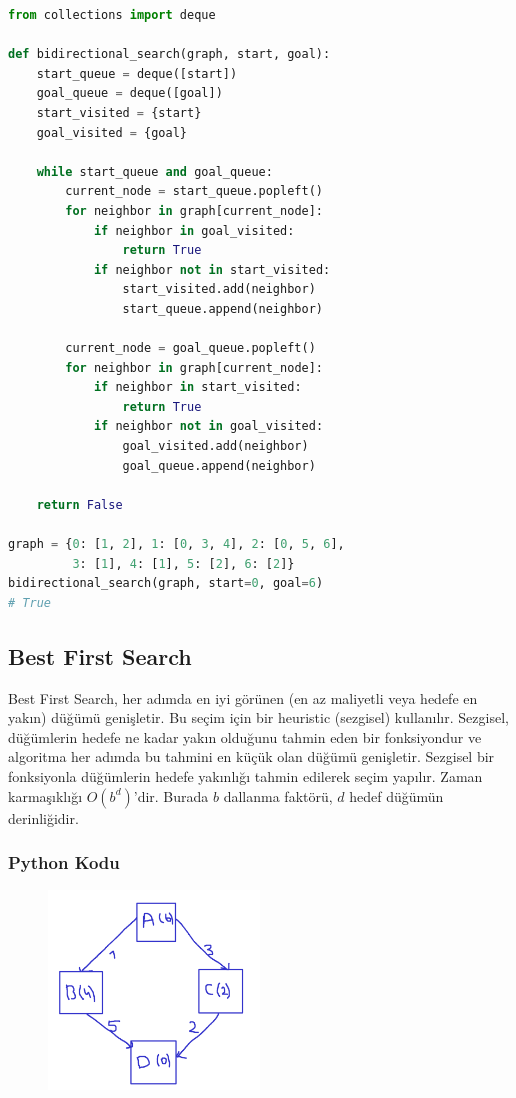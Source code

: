 \begin{lstlisting}[language=Python]
from collections import deque

def bidirectional_search(graph, start, goal):
    start_queue = deque([start])
    goal_queue = deque([goal])
    start_visited = {start}
    goal_visited = {goal}

    while start_queue and goal_queue:
        current_node = start_queue.popleft()
        for neighbor in graph[current_node]:
            if neighbor in goal_visited:
                return True
            if neighbor not in start_visited:
                start_visited.add(neighbor)
                start_queue.append(neighbor)

        current_node = goal_queue.popleft()
        for neighbor in graph[current_node]:
            if neighbor in start_visited:
                return True
            if neighbor not in goal_visited:
                goal_visited.add(neighbor)
                goal_queue.append(neighbor)

    return False

graph = {0: [1, 2], 1: [0, 3, 4], 2: [0, 5, 6],
         3: [1], 4: [1], 5: [2], 6: [2]}
bidirectional_search(graph, start=0, goal=6)
# True
\end{lstlisting}

\newpage

\subsection{Best First Search}

Best First Search, her adımda en iyi görünen (en az maliyetli veya hedefe en yakın) düğümü genişletir. Bu seçim için bir heuristic (sezgisel) kullanılır. Sezgisel, düğümlerin hedefe ne kadar yakın olduğunu tahmin eden bir fonksiyondur ve algoritma her adımda bu tahmini en küçük olan düğümü genişletir. Sezgisel bir fonksiyonla düğümlerin hedefe yakınlığı tahmin edilerek seçim yapılır. Zaman karmaşıklığı $O(b^d)$'dir. Burada $b$ dallanma faktörü, $d$ hedef düğümün derinliğidir.

\subsubsection{Python Kodu}

\begin{figure}[h]
    \centering
    \includegraphics[width=0.5\textwidth]{images/best_first_search.png}
    \caption{}
\end{figure}

